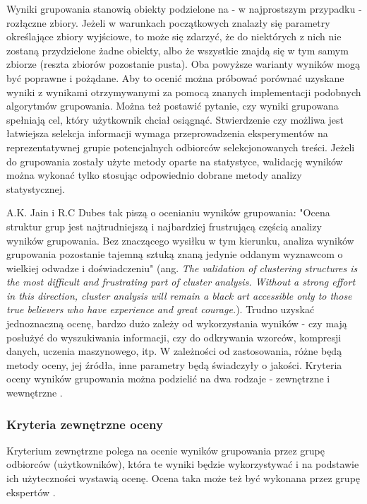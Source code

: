 \documentclass{article}
\begin{document}
Wyniki grupowania stanowią obiekty podzielone na - w najprostszym przypadku - rozłączne zbiory. Jeżeli w warunkach początkowych znalazły się parametry określające zbiory wyjściowe, to może się zdarzyć, że do niektórych z nich nie zostaną przydzielone żadne obiekty, albo że wszystkie znajdą się w tym samym zbiorze (reszta zbiorów pozostanie pusta). Oba powyższe warianty wyników mogą być poprawne i pożądane. Aby to ocenić można próbować porównać uzyskane wyniki z wynikami otrzymywanymi za pomocą znanych implementacji podobnych algorytmów grupowania. Można też postawić pytanie, czy wyniki grupowana spełniają cel, który użytkownik chciał osiągnąć. Stwierdzenie czy możliwa jest łatwiejsza selekcja informacji wymaga przeprowadzenia eksperymentów na reprezentatywnej grupie potencjalnych odbiorców selekcjonowanych treści. Jeżeli do grupowania zostały użyte metody oparte na statystyce, walidację wyników można wykonać tylko stosując odpowiednio dobrane metody analizy statystycznej\cite[1.2, p.~268]{jain_clustering}.

A.K. Jain i R.C Dubes tak piszą o ocenianiu wyników grupowania: "Ocena struktur grup jest najtrudniejszą i najbardziej frustrującą częścią analizy wyników grupowania. Bez znaczącego wysiłku w tym kierunku, analiza wyników grupowania pozostanie tajemną sztuką znaną jedynie oddanym wyznawcom o wielkiej odwadze i doświadczeniu" (ang. \textit{The validation of clustering structures is the most difficult and frustrating part of cluster analysis. Without a strong effort in this direction, cluster analysis will remain a black art accessible only to those true believers who have experience and great courage.})\cite{clustering_book}. 
Trudno uzyskać jednoznaczną ocenę, bardzo dużo zależy od wykorzystania wyników - czy mają posłużyć do wyszukiwania informacji, czy do odkrywania wzorców, kompresji danych, uczenia maszynowego, itp. W zależności od zastosowania, różne będą metody oceny, jej źródła, inne parametry będą świadczyły o jakości. Kryteria oceny wyników grupowania można podzielić na dwa rodzaje - zewnętrzne i wewnętrzne \cite{ir_book,validity_indices}. 

\subsubsection{Kryteria zewnętrzne oceny}

Kryterium zewnętrzne polega na ocenie wyników grupowania przez grupę odbiorców (użytkowników), która te wyniki będzie wykorzystywać i na podstawie ich użyteczności wystawią ocenę. Ocena taka może też być wykonana przez grupę ekspertów \cite{validity_indices}. 
\end{document}
